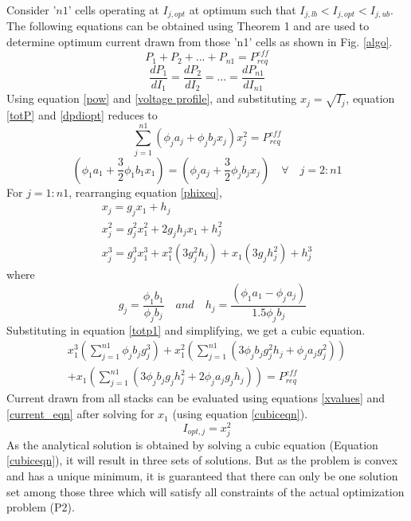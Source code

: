 \documentclass[twocolumn]{autart}
\begin{document}
Consider '$n1$' cells operating at $I_{j,opt}$ at optimum such that $I_{j,lb}<I_{j,opt}<I_{j,ub}$. The following equations can be obtained using Theorem 1 and are used to determine optimum current drawn from those 'n1' cells as shown in Fig. \ref{algo}. 
\begin{equation}
P_1 + P_2 + ... + P_{n1} = P_{req}^{eff}
\label{totP}
\end{equation}
\begin{equation}
\frac{dP_1}{dI_1} = \frac{dP_2}{dI_2} = ... =\frac{dP_{n1}}{dI_{n1}}
\label{dpdiopt}
\end{equation}
Using equation \eqref{pow} and \eqref{voltage profile}, and substituting $x_j = \sqrt{I_j}$, equation \eqref{totP} and \eqref{dpdiopt} reduces to
\begin{equation}
\sum_{j=1}^{n1}\left(\phi_{j} a_j+\phi_j b_{j}x_j \right)x_j^2 = P_{req}^{eff}
\label{totp1}
\end{equation}
\begin{equation}
 \left(\phi_1 a_{1}+\frac{3}{2} \phi_1 b_{1}x_1 \right)=   \left( \phi_j a_{j}+\frac{3}{2} \phi_j b_{j}x_j \right) \quad \forall \quad j = 2:n1
 \label{phixeq}
\end{equation}
For $j = 1:n1$, rearranging equation \eqref{phixeq},
\begin{gather}
x_j = g_j x_1 + h_j  \label{xvalues}\\
x_{j}^2 = g_j^2 x_1^2 + 2 g_j h_j x_1 + h_j^2\\
x_j^3 = g_j^3 x_1^3 + x_1^2 \left(3g_j^2 h_j\right) + x_1 \left(3g_j h_j^2\right) + h_j^3
\end{gather}
where
\begin{equation}
\quad g_j = \frac{\phi_1 b_{1}}{\phi_j b_{j}} \quad and \quad
h_j = \frac{\left( \phi_1 a_{1} - \phi_j a_{j} \right)}{1.5\phi_j b_{j}}
\end{equation}
Substituting in equation \eqref{totp1} and simplifying, we get a cubic equation. 
\begin{multline}
x_1^3 \left(\sum_{j=1}^{n1}\phi_j b_{j}g_j^3 \right) + 
x_1^2 \left(\sum_{j=1}^{n1}\left(3\phi_j b_{j}g_j^2 h_j + \phi_j a_{j}g_j^2 \right) \right)\\ +x_1 \left(\sum_{j=1}^{n1} \left(3\phi_j b_{j}g_j h_j^2 + 2\phi_j a_{j}g_j h_j \right) \right) =P_{req}^{eff} 
\label{cubiceqn}
\end{multline}
Current drawn from all stacks can be evaluated using equations \eqref{xvalues} and \eqref{current_eqn} after solving for $x_1$ (using equation \eqref{cubiceqn}).
\begin{equation}
\label{current_eqn}
I_{opt,j} = x_j^2
\end{equation}
As the analytical solution is obtained by solving a cubic equation (Equation \eqref{cubiceqn}), it will result in three sets of solutions. But as the problem is convex and has a unique minimum, it is guaranteed that there can only be one solution set among those three which will satisfy all constraints of the actual optimization problem (P2). 
\end{document}
